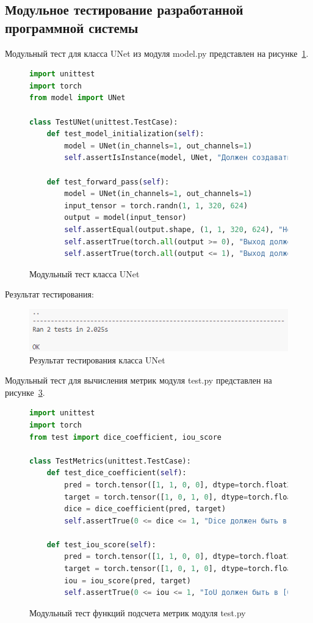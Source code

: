\subsection{Модульное тестирование разработанной программной системы}

Модульный тест\cite{hillard-packaging} для класса UNet из модуля model.py представлен на рисунке~\ref{model_test:image}.

\begin{figure}[H]
\begin{lstlisting}[language=Python]
import unittest
import torch
from model import UNet

class TestUNet(unittest.TestCase):
	def test_model_initialization(self):
		model = UNet(in_channels=1, out_channels=1)
		self.assertIsInstance(model, UNet, "Должен создаваться экземпляр UNet")
	
	def test_forward_pass(self):
		model = UNet(in_channels=1, out_channels=1)
		input_tensor = torch.randn(1, 1, 320, 624)
		output = model(input_tensor)
		self.assertEqual(output.shape, (1, 1, 320, 624), "Некорректный размер вывода")
		self.assertTrue(torch.all(output >= 0), "Выход должен быть ≥ 0")
		self.assertTrue(torch.all(output <= 1), "Выход должен быть ≤ 1")
\end{lstlisting}  
\caption{Модульный тест класса UNet}
\label{model_test:image}
\end{figure}

Результат тестирования:
\begin{figure}[H]
	\centering
	\includegraphics[width=0.7\linewidth]{images/model_test_results}
	\caption{Результат тестирования класса UNet}
	\label{fig:modeltestresults}
\end{figure}

Модульный тест для вычисления метрик модуля test.py представлен на рисунке~\ref{test_test:image}.

\begin{figure}[H]
	\begin{lstlisting}[language=Python]
import unittest
import torch
from test import dice_coefficient, iou_score

class TestMetrics(unittest.TestCase):
	def test_dice_coefficient(self):
		pred = torch.tensor([1, 1, 0, 0], dtype=torch.float32)
		target = torch.tensor([1, 0, 1, 0], dtype=torch.float32)
		dice = dice_coefficient(pred, target)
		self.assertTrue(0 <= dice <= 1, "Dice должен быть в [0, 1]")

	def test_iou_score(self):
		pred = torch.tensor([1, 1, 0, 0], dtype=torch.float32)
		target = torch.tensor([1, 0, 1, 0], dtype=torch.float32)
		iou = iou_score(pred, target)
		self.assertTrue(0 <= iou <= 1, "IoU должен быть в [0, 1]")
	\end{lstlisting}  
	\caption{Модульный тест функций подсчета метрик модуля test.py}
	\label{test_test:image}
\end{figure}

